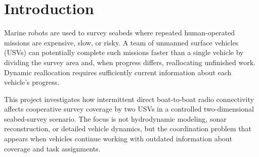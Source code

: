 \section{Introduction}

Marine robots are used to survey seabeds where repeated human-operated missions are expensive, slow, or risky. A team of unmanned surface vehicles (USVs) can potentially complete such missions faster than a single vehicle by dividing the survey area and, when progress differs, reallocating unfinished work. Dynamic reallocation requires sufficiently current information about each vehicle's progress.

This project investigates how intermittent direct boat-to-boat radio connectivity affects cooperative survey coverage by two USVs in a controlled two-dimensional seabed-survey scenario. The focus is not hydrodynamic modeling, sonar reconstruction, or detailed vehicle dynamics, but the coordination problem that appears when vehicles continue working with outdated information about coverage and task assignments.
